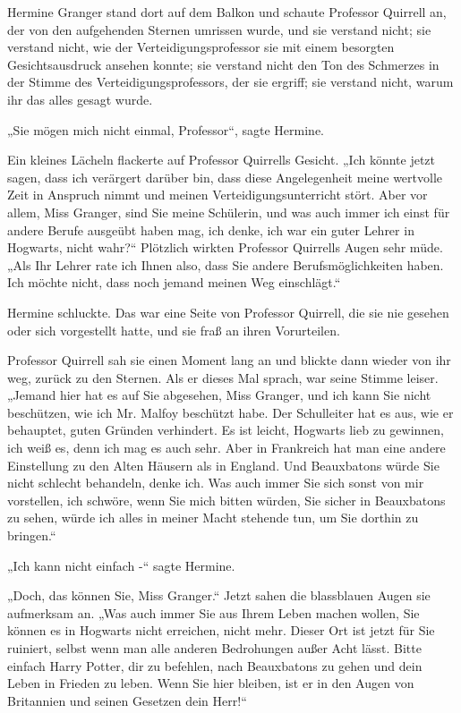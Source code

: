 {Hermine Granger stand dort auf dem Balkon und schaute Professor Quirrell an, der von den aufgehenden Sternen umrissen wurde, und sie verstand nicht; sie verstand nicht, wie der Verteidigungsprofessor sie mit einem besorgten Gesichtsausdruck ansehen konnte; sie verstand nicht den Ton des Schmerzes in der Stimme des Verteidigungsprofessors, der sie ergriff; sie verstand nicht, warum ihr das alles gesagt wurde.

„Sie mögen mich nicht einmal, Professor“, sagte Hermine.

Ein kleines Lächeln flackerte auf Professor Quirrells Gesicht. „Ich könnte jetzt sagen, dass ich verärgert darüber bin, dass diese Angelegenheit meine wertvolle Zeit in Anspruch nimmt und meinen Verteidigungsunterricht stört. Aber vor allem, Miss Granger, sind Sie meine Schülerin, und was auch immer ich einst für andere Berufe ausgeübt haben mag, ich denke, ich war ein guter Lehrer in Hogwarts, nicht wahr?“ Plötzlich wirkten Professor Quirrells Augen sehr müde.\\ „Als Ihr Lehrer rate ich Ihnen also, dass Sie andere Berufsmöglichkeiten haben. Ich möchte nicht, dass noch jemand meinen Weg einschlägt.“

Hermine schluckte. Das war eine Seite von Professor Quirrell, die sie nie gesehen oder sich vorgestellt hatte, und sie fraß an ihren Vorurteilen.

Professor Quirrell sah sie einen Moment lang an und blickte dann wieder von ihr weg, zurück zu den Sternen. Als er dieses Mal sprach, war seine Stimme leiser. „Jemand hier hat es auf Sie abgesehen, Miss Granger, und ich kann Sie nicht beschützen, wie ich Mr. Malfoy beschützt habe. Der Schulleiter hat es aus, wie er behauptet, guten Gründen verhindert. Es ist leicht, Hogwarts lieb zu gewinnen, ich weiß es, denn ich mag es auch sehr. Aber in Frankreich hat man eine andere Einstellung zu den Alten Häusern als in England. Und Beauxbatons würde Sie nicht schlecht behandeln, denke ich. Was auch immer Sie sich sonst von mir vorstellen, ich schwöre, wenn Sie mich bitten würden, Sie sicher in Beauxbatons zu sehen, würde ich alles in meiner Macht stehende tun, um Sie dorthin zu bringen.“

„Ich kann nicht einfach -“ sagte Hermine.

„Doch, das können Sie, Miss Granger.“ Jetzt sahen die blassblauen Augen sie aufmerksam an. „Was auch immer Sie aus Ihrem Leben machen wollen, Sie können es in Hogwarts nicht erreichen, nicht mehr. Dieser Ort ist jetzt für Sie ruiniert, selbst wenn man alle anderen Bedrohungen außer Acht lässt. Bitte einfach Harry Potter, dir zu befehlen, nach Beauxbatons zu gehen und dein Leben in Frieden zu leben. Wenn Sie hier bleiben, ist er in den Augen von Britannien und seinen Gesetzen dein Herr!“

}
